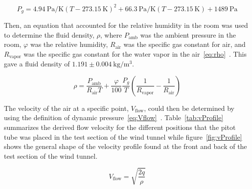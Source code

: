 \documentclass[journal,letterpaper]{IEEEtran}
\begin{document}
\begin{equation} \label{eq:PSat}
    P_g = \qty{4.94}{\pascal\per\K}(T - \qty{273.15}{\K})^2 + \qty{66.3}{\pascal\per\K}(T - \qty{273.15}{\K}) + \qty{1489}{\pascal}
\end{equation}

Then, an equation that accounted for the relative humidity in the room was used to determine the fluid density, $\rho$, where $P_\text{amb}$ was the ambient pressure in the room, $\varphi$ was the relative humidity, $R_\text{air}$ was the specific gas constant for air, and $R_\text{vapor}$ was the specific gas constant for the water vapor in the air~\eqref{eq:rho}~\cite{calculator}.
This gave a fluid density of $1.191 \pm \qty{0.004}{\kg\per\m\cubed}$.

\begin{equation} \label{eq:rho}
    \rho = \frac{P_\text{amb}}{R_\text{air} T} + \frac{\varphi}{100}\frac{P_g}{T}\left(\frac{1}{R_\text{vapor}} - \frac{1}{R_\text{air}}\right)
\end{equation}

The velocity of the air at a specific point, $V_\text{flow}$, could then be determined by using the definition of dynamic pressure~\eqref{eq:Vflow}~\cite{lecture}.
Table~\ref{tab:vProfile} summarizes the derived flow velocity for the different positions that the pitot tube was placed in the test section of the wind tunnel while figure~\ref{fig:vProfile} shows the general shape of the velocity profile found at the front and back of the test section of the wind tunnel.

\begin{equation} \label{eq:Vflow}
    V_\text{flow} = \sqrt{\frac{2q}{\rho}}
\end{equation}
\end{document}
